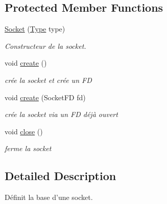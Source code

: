 \subsection*{Protected Member Functions}
\begin{DoxyCompactItemize}
\item 
\hyperlink{classmognetwork_1_1_socket_a27ed1b1c76de76da577ccbf5b0b687ef}{Socket} (\hyperlink{classmognetwork_1_1_socket_a70fb1fd697cfe89987e81bbe9db8ea4d}{Type} type)
\begin{DoxyCompactList}\small\item\em Constructeur de la socket. \end{DoxyCompactList}\item 
\hypertarget{classmognetwork_1_1_socket_a442e315822bc0fbeeb7c5669a0dceacc}{void \hyperlink{classmognetwork_1_1_socket_a442e315822bc0fbeeb7c5669a0dceacc}{create} ()}\label{classmognetwork_1_1_socket_a442e315822bc0fbeeb7c5669a0dceacc}

\begin{DoxyCompactList}\small\item\em crée la socket et crée un F\-D \end{DoxyCompactList}\item 
\hypertarget{classmognetwork_1_1_socket_a60e3f8b01b89ba0ce03c24ac92e4be0d}{void \hyperlink{classmognetwork_1_1_socket_a60e3f8b01b89ba0ce03c24ac92e4be0d}{create} (Socket\-F\-D fd)}\label{classmognetwork_1_1_socket_a60e3f8b01b89ba0ce03c24ac92e4be0d}

\begin{DoxyCompactList}\small\item\em crée la socket via un F\-D déjà ouvert \end{DoxyCompactList}\item 
\hypertarget{classmognetwork_1_1_socket_a7e8f6bc7f729be6cf1d8c1d5dd638a0b}{void \hyperlink{classmognetwork_1_1_socket_a7e8f6bc7f729be6cf1d8c1d5dd638a0b}{close} ()}\label{classmognetwork_1_1_socket_a7e8f6bc7f729be6cf1d8c1d5dd638a0b}

\begin{DoxyCompactList}\small\item\em ferme la socket \end{DoxyCompactList}\end{DoxyCompactItemize}


\subsection{Detailed Description}
Définit la base d'une socket. 

